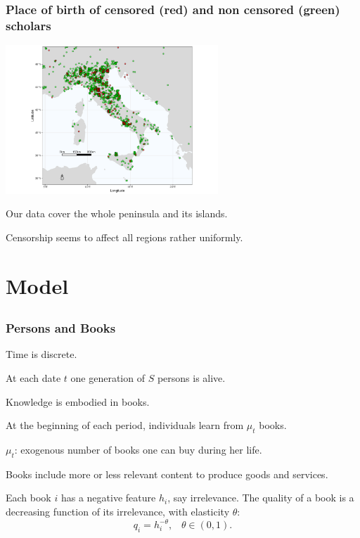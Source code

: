 \documentclass[usepdftitle=false,aspectratio=169,xcolor=dvipsnames]{beamer}
\begin{document}
	\begin{frame}
\frametitle{Place of birth of censored (red) and non censored (green) scholars}

\parbox{9cm}{\includegraphics[width=8cm,trim=3cm .6cm 3cm .8cm,clip]{map-italy.pdf}}\;\;
\parbox{4cm}{
Our data cover the whole peninsula and its islands.

\vspace{1cm}Censorship seems to affect all regions rather uniformly.
}
\end{frame}


	\section{Model}
	\subsection{}

	\begin{frame}
\frametitle{Persons and Books}

Time is discrete.

 At each date $t$ one generation of $S$ persons is alive.


  Knowledge is embodied in books.

At the beginning of each period,  individuals  learn from $\mu_t$ books.


$\mu_t$: exogenous number of books one can buy during her life.


 Books include more or less relevant content to produce goods and services.


Each book  $i$ has a negative feature $h_i$, say irrelevance.
 The quality of a book is a decreasing function of its irrelevance, with elasticity $\theta$:
\begin{equation}\label{eq:qi}
q_i=h_i^{-\theta}, \;\;\; \theta\in(0,1).
\end{equation}
\end{frame}
\end{document}
